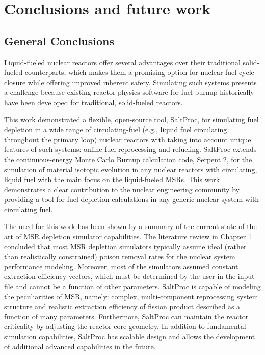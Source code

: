 \chapter{Conclusions and future work}

\section{General Conclusions}
Liquid-fueled nuclear reactors offer several advantages over their traditional 
solid-fueled counterparts, which makes them a promising option for nuclear 
fuel cycle closure while offering improved inherent safety. Simulating such 
systems presents a challenge because existing reactor physics software for 
fuel burnup historically have been developed for traditional, solid-fueled 
reactors.

This work demonstrated a flexible, open-source tool, SaltProc, for 
simulating fuel depletion in a wide range of circulating-fuel (e.g., liquid 
fuel circulating throughout the primary loop) nuclear reactors with 
taking into account unique features of such systems: online fuel reprocessing 
and refueling. SaltProc extends the continuous-energy Monte Carlo Burnup 
calculation code, Serpent 2, for the simulation of material
isotopic evolution 
in any nuclear reactors with circulating, liquid fuel with the main focus on 
the liquid-fueled \glspl{MSR}. This work demonstrates a clear contribution to 
the nuclear engineering community by providing a tool for fuel depletion 
calculations in any generic nuclear system with circulating fuel.

The need for this work has been shown by a summary of the current state of the 
art of \gls{MSR} depletion simulator capabilities. The literature review in 
Chapter 1 concluded that most \gls{MSR} depletion simulators typically assume 
ideal (rather than realistically constrained) poison removal rates for the 
nuclear system performance modeling. Moreover, most of the simulators assumed 
constant extraction efficiency vectors, which must be determined by the user 
in the input file and cannot be a function of other parameters. SaltProc is 
capable of modeling the peculiarities of \gls{MSR}, namely:
complex, multi-component reprocessing system structure and realistic 
extraction efficiency of fission product described as a function of 
many parameters. Furthermore, SaltProc can maintain the reactor 
criticality by adjusting the reactor core geometry. In addition to fundamental 
simulation capabilities, SaltProc has scalable design and allows the 
development of additional advanced capabilities in the future.

